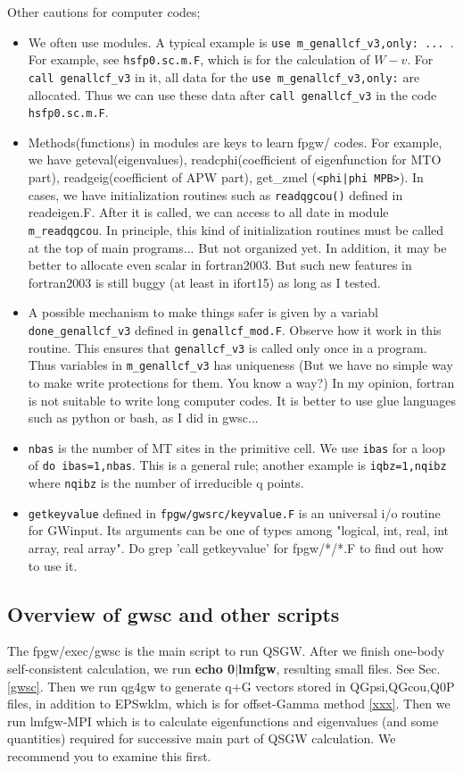 \documentclass[a4paper,10pt,epsf,fleqn]{article}
\newcommand{\exe}[1]{{\bf #1}}
\newcommand{\io}[1]{{\sf  #1}}
\newcommand{\raw}[1]{{\tt #1}}
\begin{document}
Other cautions for computer codes;
\begin{itemize}
\item 
We often use modules. A typical example is \verb#use m_genallcf_v3,only: ... #. For example, see \raw{hsfp0.sc.m.F}, which is for the calculation of $W-v$.
For \verb#call genallcf_v3# in it, all data for the 
\verb#use m_genallcf_v3,only:# are allocated. Thus we can use these data
after \verb#call genallcf_v3# in the code \raw{hsfp0.sc.m.F}.
\item
Methods(functions) in modules are keys to learn fpgw/ codes.
For example, we have geteval(eigenvalues), 
readcphi(coefficient of eigenfunction for MTO part),
readgeig(coefficient of APW part), get\_zmel (\verb#<phi|phi MPB>#).
In cases, we have initialization routines such as
\raw{readqgcou()} defined in \io{readeigen.F}.
After it is called, we can access to all date in module \verb#m_readqgcou#.
In principle, this kind of initialization routines must be called
at the top of main programs... But not organized yet.
In addition, it may be better to allocate even scalar in fortran2003.
But such new features in fortran2003 is still buggy
(at least in ifort15) as long as I tested.
\item
A possible mechanism to make things safer 
is given by a variabl \verb#done_genallcf_v3# defined in \verb#genallcf_mod.F#.
Observe how it work in this routine.
This ensures that \verb#genallcf_v3# is called only once in a program.
Thus variables in \verb#m_genallcf_v3# has uniqueness
(But we have no simple way to make write protections for them. 
You know a way?)
In my opinion, fortran is not suitable to write long computer codes.
It is better to use glue languages such as python or bash, as I did in gwsc...
\item
\verb#nbas# is the number of MT sites in the primitive cell.
We use \verb#ibas# for a loop of \verb#do ibas=1,nbas#.
This is a general rule; another example is \verb#iqbz=1,nqibz#
where \verb#nqibz# is the number of irreducible q points.
\item
\verb#getkeyvalue# defined in \verb#fpgw/gwsrc/keyvalue.F#
is an universal i/o routine for \io{GWinput}.
Its arguments can be one of types among 
"logical, int, real, int array, real array".
Do grep 'call getkeyvalue' for fpgw/*/*.F 
to find out how to use it.
\end{itemize}

\subsection{Overview of gwsc and other scripts}
The fpgw/exec/gwsc is the main script to run QSGW.
After we finish one-body self-consistent calculation, 
we run \exe{echo 0$|$lmfgw}, resulting small files.
See Sec.\ref{gwsc}. Then we run qg4gw to generate q+G vectors
stored in \io{QGpsi,QGcou,Q0P} files, in addition to EPSwklm, which is for offset-Gamma method \ref{xxx}.
Then we run lmfgw-MPI which is to calculate eigenfunctions
and eigenvalues (and some quantities) required for successive
main part of QSGW calculation.
We recommend you to examine this first.
\end{document}
